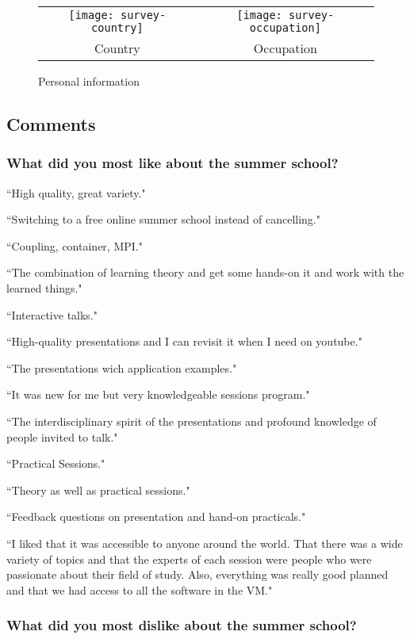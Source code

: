 \begin{figure}[H]
\centering
\begin{tabular}{cc}
\texttt{[image: survey-country]} &
\texttt{[image: survey-occupation]} \\
\hspace{-4cm} Country & \hspace{-3.5cm} Occupation
\end{tabular}
\caption{Personal information}
\end{figure}

\subsection{Comments}

\subsubsection{What did you most like about the summer school?}

``High quality, great variety."

``Switching to a free online summer school instead of cancelling."

``Coupling, container, MPI."

``The combination of learning theory and get some hands-on it and work with the learned things."

``Interactive talks."

``High-quality presentations and I can revisit it when I need on youtube."

``The presentations wich application examples."

``It was new for me but very knowledgeable sessions program."

``The interdisciplinary spirit of the presentations and profound knowledge of people invited to talk."

``Practical Sessions."

``Theory as well as practical sessions."

``Feedback questions on presentation and hand-on practicals."

``I liked that it was accessible to anyone around the world. That there was a wide variety of topics and that the experts of each session were people who were passionate about their field of study. Also, everything was really good planned and that we had access to all the software in the VM."

\subsubsection{What did you most dislike about the summer school?}

